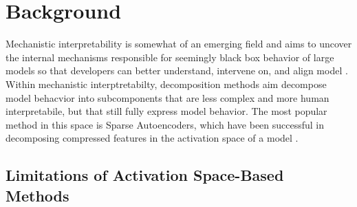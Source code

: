 \documentclass{article}
\theoremstyle{plain}
\theoremstyle{definition}
\theoremstyle{remark}
\begin{document}
\section{Background}


Mechanistic interpretability is somewhat of an emerging field and aims to uncover the internal mechanisms responsible for seemingly black box behavior of large models so that developers can better understand, intervene on, and align model \cite{bereska2024mechanistic}. Within mechanistic interptretabilty, decomposition methods aim decompose model behacvior into subcomponents that are less complex and more human interpretabile, but that still fully express model behavior. The most popular method in this space is Sparse Autoencoders, which have been successful in decomposing compressed features in the activation space of a model \cite{gao2024scaling,cunningham2023sparse,bricken2023towards}.

\subsection{Limitations of Activation Space-Based Methods}



\end{document}
